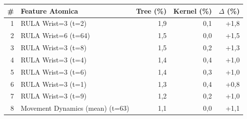 \begin{tabular*}{\linewidth}{@{}r@{\extracolsep{\fill}}lrrr@{}}
\toprule
\textbf{\#} & \textbf{Feature Atomica} & \textbf{Tree (\%)} & \textbf{Kernel (\%)} & \textbf{$\Delta$ (\%)} \\
\midrule
1 & RULA Wrist=3 (t=2) & 1{,}9 & 0{,}1 & +1{,}8 \\
2 & RULA Wrist=6 (t=64) & 1{,}5 & 0{,}0 & +1{,}5 \\
3 & RULA Wrist=3 (t=8) & 1{,}5 & 0{,}2 & +1{,}3 \\
4 & RULA Wrist=3 (t=4) & 1{,}4 & 0{,}4 & +1{,}0 \\
5 & RULA Wrist=3 (t=6) & 1{,}4 & 0{,}3 & +1{,}0 \\
6 & RULA Wrist=3 (t=1) & 1{,}3 & 0{,}4 & +0{,}8 \\
7 & RULA Wrist=3 (t=9) & 1{,}2 & 0{,}2 & +1{,}0 \\
8 & Movement Dynamics (mean) (t=63) & 1{,}1 & 0{,}0 & +1{,}1 \\
\bottomrule
\end{tabular*}
